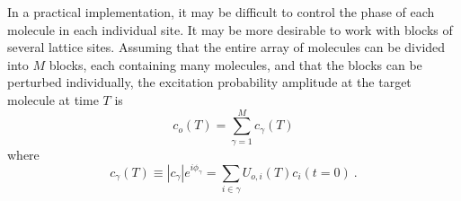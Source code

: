 In a practical implementation, it may be difficult to control the phase of each molecule in each
individual site. It may be more desirable to work with blocks of several lattice sites. Assuming that the entire array of molecules 
can be divided into $M$ blocks, each containing many molecules, and that the blocks can be perturbed individually, the excitation probability amplitude at the target molecule at time $T$ is 
%
\begin{equation} c_{o}(T) =  \sum_{\gamma=1}^M c_{\gamma}(T)
\label{blocks-contribution}
\end{equation}
%
where
%
\begin{equation} c_\gamma(T) \equiv |c_\gamma| e^{i\phi_\gamma}= \sum_{i\in
 \gamma} U_{o, i}(T)c_i(t=0) \ .
\label{inblock-contribution}
\end{equation}
%
%

